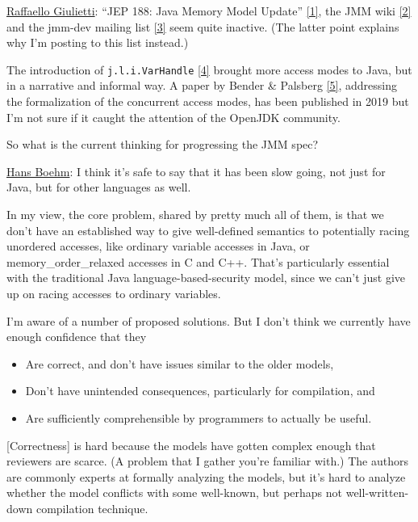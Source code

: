\href{https://mail.openjdk.java.net/pipermail/jdk-dev/2021-August/005904.html}{Raffaello Giulietti}:
``JEP 188: Java Memory Model Update'' \href{https://openjdk.java.net/jeps/188}{[1]}, the JMM wiki \href{https://wiki.openjdk.java.net/display/jmm/Main}{[2]} and the 
jmm-dev mailing list \href{https://mail.openjdk.java.net/pipermail/jmm-dev/}{[3]} seem quite inactive. (The latter point explains 
why I'm posting to this list instead.)

The introduction of \texttt{j.l.i.VarHandle} \href{https://docs.oracle.com/en/java/javase/16/docs/api/java.base/java/lang/invoke/VarHandle.html}{[4]} brought more access modes to 
Java, but in a narrative and informal way. A paper by Bender \& Palsberg 
\href{https://dl.acm.org/doi/10.1145/3360568}{[5]}, addressing the formalization of the concurrent access modes, has 
been published in 2019 but I'm not sure if it caught the attention of 
the OpenJDK community.

So what is the current thinking for progressing the JMM spec?

\bigskip

\href{https://mail.openjdk.java.net/pipermail/jdk-dev/2021-August/005909.html}{Hans Boehm}:
I think it's safe to say that it has been slow going, not just for Java,
but for other languages as well.

In my view, the core problem, shared by pretty much all of them, is that we
don't have an established way to give well-defined semantics to potentially
racing unordered accesses, like ordinary variable accesses in Java, or
memory\_order\_relaxed accesses in C and C++. That's particularly essential
with the traditional Java language-based-security model, since we can't
just give up on racing accesses to ordinary variables.

I'm aware of a number of proposed solutions. But I don't think we currently
have enough confidence that they
\begin{itemize}
\item Are correct, and don't have issues similar to the older models,
\item Don't have unintended consequences, particularly for compilation, and
\item Are sufficiently comprehensible by programmers to actually be useful.
\end{itemize}
[Correctness] is hard because the models have gotten complex enough that reviewers
are scarce. (A problem that I gather you're familiar with.) The authors are
commonly experts at formally analyzing the models, but it's hard to analyze
whether the model conflicts with some well-known, but perhaps not
well-written-down compilation technique.

